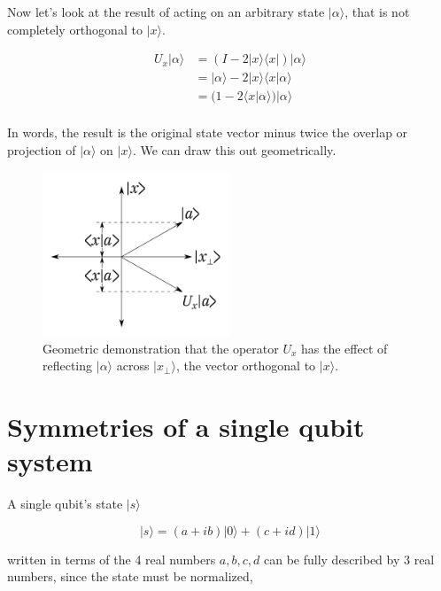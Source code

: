 \documentclass[12pt]{amsart}
\begin{document}
Now let's look at the result of acting on an arbitrary state $|\alpha\rangle$, that is not completely orthogonal to $|x\rangle$.

\begin{equation}
	\begin{split}
		U_x |\alpha\rangle & = (I - 2 |x\rangle\langle x| ) |\alpha\rangle \\
		& = |\alpha\rangle - 2 |x\rangle\langle x | \alpha\rangle \\
		& = (1 - 2 \langle x | \alpha\rangle)  |\alpha\rangle \\
	\end{split}
\end{equation}

In words, the result is the original state vector minus twice the overlap or projection of $|\alpha\rangle$ on $|x\rangle$. We can draw this out geometrically.
\begin{figure}[h]
   \centering
   \includegraphics[width=0.5\textwidth]{./img/fig-00} %
   \caption{Geometric demonstration that the operator $U_x$ has the effect of reflecting $|\alpha\rangle$ across $|x_\perp\rangle$, the vector orthogonal to $|x\rangle$.}
   \label{fig:example}
\end{figure}




\section{Symmetries of a single qubit system}
A single qubit's state $|s\rangle$ 

\begin{equation}
	|s\rangle = (a+ib)|0\rangle + (c + id)|1\rangle
\end{equation}

written in terms of the 4 real numbers $a,b,c,d$ can be fully described by 3 real numbers, since the state must be normalized,
\end{document}
